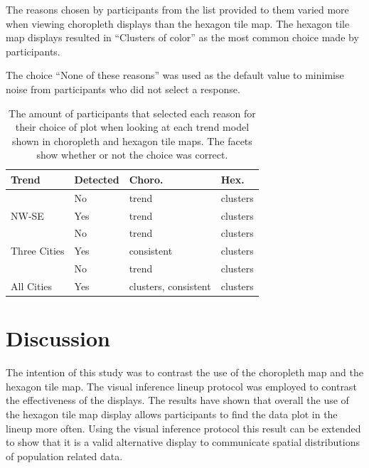 \documentclass{monashthesis}
\begin{document}
The reasons chosen by participants from the list provided to them varied more when viewing choropleth displays than the hexagon tile map.
The hexagon tile map displays resulted in ``Clusters of color'' as the most common choice made by participants.

The choice ``None of these reasons'' was used as the default value to minimise noise from participants who did not select a response.

\begin{table}[!h]

\caption{\label{tab:reason}The amount of participants that selected each reason for their choice of plot when looking at each trend model shown in choropleth and hexagon tile maps. The facets show whether or not the choice was correct.}
\centering
\begin{tabular}[t]{llll}
\toprule
Trend & Detected & Choro. & Hex.\\
\midrule
 & No & trend & clusters\\
\cmidrule{2-4}
\multirow{-2}{*}{\raggedright\arraybackslash NW-SE} & Yes & trend & clusters\\
\cmidrule{1-4}
 & No & trend & clusters\\
\cmidrule{2-4}
\multirow{-2}{*}{\raggedright\arraybackslash Three Cities} & Yes & consistent & clusters\\
\cmidrule{1-4}
 & No & trend & clusters\\
\cmidrule{2-4}
\multirow{-2}{*}{\raggedright\arraybackslash All Cities} & Yes & clusters, consistent & clusters\\
\bottomrule
\end{tabular}
\end{table}

\hypertarget{discussion}{%
\section{Discussion}\label{discussion}}

The intention of this study was to contrast the use of the choropleth map and the hexagon tile map.
The visual inference lineup protocol was employed to contrast the effectiveness of the displays.
The results have shown that overall the use of the hexagon tile map display allows participants to find the data plot in the lineup more often.
Using the visual inference protocol this result can be extended to show that it is a valid alternative display to communicate spatial distributions of population related data.
\end{document}
